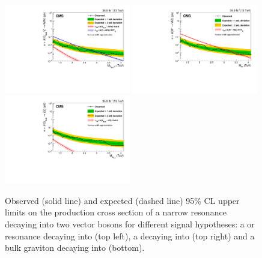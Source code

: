 \begin{figure}[h!]
\centering
    \includegraphics[width=0.49\textwidth]{figures/analysis/search2/B2G-17-001/figures/brazilianFlag_BulkWW_VVnew_new_combined_13TeV.pdf}
    \includegraphics[width=0.49\textwidth]{figures/analysis/search2/B2G-17-001/figures/brazilianFlag_WZ_VVnew_new_combined_13TeV.pdf}\\
    \includegraphics[width=0.49\textwidth]{figures/analysis/search2/B2G-17-001/figures/brazilianFlag_BulkZZ_VVnew_new_combined_13TeV.pdf}
\caption{Observed (solid line) and expected (dashed line) 95\% CL upper limits on the production cross section of a narrow resonance decaying into two vector bosons for different signal hypotheses: a \PZpr or \BulkG resonance decaying into \WW (top left), a \PZpr decaying into \PW\PZ (top right) and a bulk graviton decaying into \ZZ (bottom).}
\label{fig:searchII:limitCombined_VV}
\end{figure}
